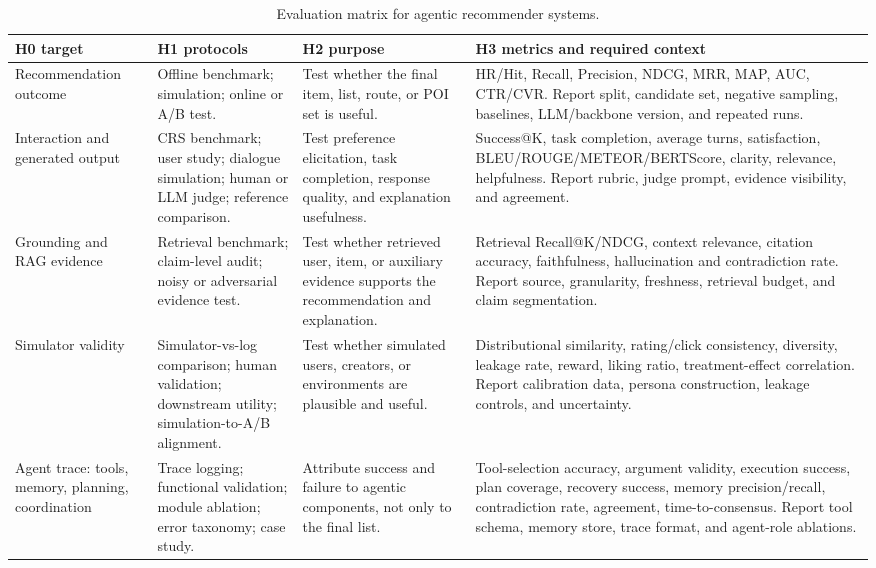 

\begin{table}[!t]
\centering
\footnotesize
\setlength{\tabcolsep}{3.5pt}
\renewcommand{\arraystretch}{1.08}
\caption{Evaluation matrix for agentic recommender systems.}
\vspace{-8pt}
\label{tab:ars-eval-matrix}
\begin{tabularx}{\textwidth}{@{}p{}p{}p{}X@{}}
\toprule
\textbf{H0 target} & \textbf{H1 protocols} & \textbf{H2 purpose} & \textbf{H3 metrics and required context} \\
\midrule
Recommendation outcome & Offline benchmark; simulation; online or A/B test. & Test whether the final item, list, route, or POI set is useful. & HR/Hit, Recall, Precision, NDCG, MRR, MAP, AUC, CTR/CVR. Report split, candidate set, negative sampling, baselines, LLM/backbone version, and repeated runs. \\
Interaction and generated output & CRS benchmark; user study; dialogue simulation; human or LLM judge; reference comparison. & Test preference elicitation, task completion, response quality, and explanation usefulness. & Success@K, task completion, average turns, satisfaction, BLEU/ROUGE/METEOR/BERTScore, clarity, relevance, helpfulness. Report rubric, judge prompt, evidence visibility, and agreement. \\
Grounding and RAG evidence & Retrieval benchmark; claim-level audit; noisy or adversarial evidence test. & Test whether retrieved user, item, or auxiliary evidence supports the recommendation and explanation. & Retrieval Recall@K/NDCG, context relevance, citation accuracy, faithfulness, hallucination and contradiction rate. Report source, granularity, freshness, retrieval budget, and claim segmentation. \\
Simulator validity & Simulator-vs-log comparison; human validation; downstream utility; simulation-to-A/B alignment. & Test whether simulated users, creators, or environments are plausible and useful. & Distributional similarity, rating/click consistency, diversity, leakage rate, reward, liking ratio, treatment-effect correlation. Report calibration data, persona construction, leakage controls, and uncertainty. \\
Agent trace: tools, memory, planning, coordination & Trace logging; functional validation; module ablation; error taxonomy; case study. & Attribute success and failure to agentic components, not only to the final list. & Tool-selection accuracy, argument validity, execution success, plan coverage, recovery success, memory precision/recall, contradiction rate, agreement, time-to-consensus. Report tool schema, memory store, trace format, and agent-role ablations. \\

\end{tabularx}
\end{table}
